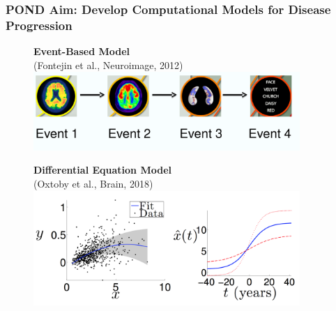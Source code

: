 \documentclass[8pt,xcolor=table,aspectratio=169]{beamer}
\begin{document}
\begin{frame}
\frametitle{POND Aim: Develop Computational Models for Disease Progression}

\newcommand{\mnpHeight}{3cm}

\vspace{-3em}
  
  
  \hspace{-2em}
  \begin{small}
  \begin{figure}[h]
  \centering
    \begin{minipage}[t][\mnpHeight][t]{0.49\linewidth}
  \centering
    \textbf{Event-Based Model}\\ \footnotesize{(Fontejin et al., Neuroimage, 2012)}\\    
    \includegraphics[width=0.9\textwidth,trim=0 0 0 0,clip]{ebm_openday}
      \vspace{1em}
  \end{minipage}
  \begin{minipage}[t][\mnpHeight][t]{0.49\linewidth}
    \centering
    \textbf{Differential Equation Model}\\ \footnotesize{(Oxtoby et al., Brain, 2018)}
    \includegraphics[width=0.9\textwidth,trim=0 0 0 0, clip]{dem_neil}
  \end{minipage}


\end{figure}
\end{small}
\end{frame}
\end{document}
